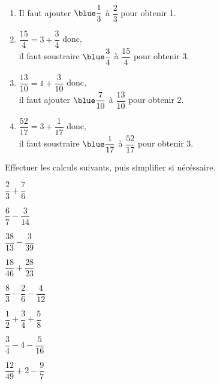 \begin{colonne*exercice}
\begin{corrige}
   \ \\ [-5mm]
   \begin{enumerate}
      \item Il faut ajouter $\blue \dfrac13$ à $\dfrac23$ pour obtenir 1. \bigskip
      \item $\dfrac{15}{4} =3+\dfrac34$ donc, \\ [1mm]
         il faut soustraire $\blue \dfrac34$ à $\dfrac{15}{4}$ pour obtenir 3. \bigskip
      \item $\dfrac{13}{10} =1+\dfrac{3}{10}$ donc, \\ [1mm]
         il faut ajouter $\blue \dfrac{7}{10}$ à $\dfrac{13}{10}$ pour obtenir 2. \bigskip
      \item $\dfrac{52}{17} =3+\dfrac{1}{17}$ donc, \\ [1mm]
         il faut soustraire $\blue \dfrac{1}{17}$ à $\dfrac{52}{17}$ pour obtenir 3. \bigskip
   \end{enumerate}
\end{corrige}

\bigskip


\begin{exercice} %
   Effectuer les calculs suivants, puis simplifier si nécéssaire. \smallskip
   \begin{colenumerate}{2}
      \item $\dfrac23+\dfrac76$ \smallskip
      \item $\dfrac67-\dfrac3{14}$ \smallskip
      \item $\dfrac{38}{13}-\dfrac3{39}$ \smallskip
      \item $\dfrac{18}{46}+\dfrac{28}{23}$ \smallskip
      \item $\dfrac83-\dfrac26-\dfrac4{12}$
      \item $\dfrac12+\dfrac34+\dfrac58$
      \item $\dfrac34-4-\dfrac5{16}$
      \item $\dfrac{12}{49}+2-\dfrac97$
   \end{colenumerate}
\end{exercice}


\end{colonne*exercice}
